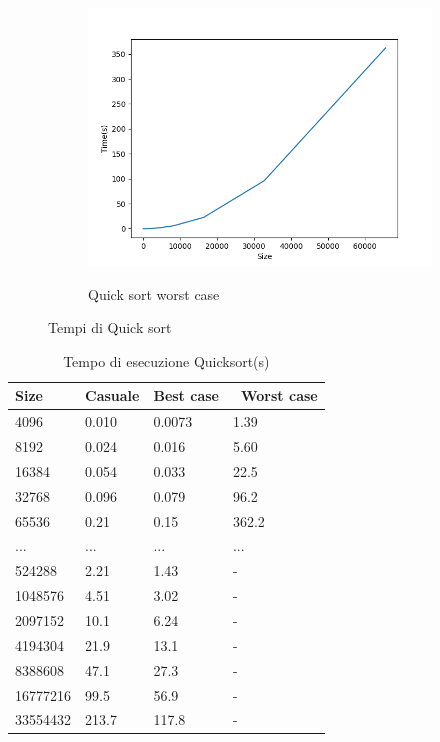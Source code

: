 \documentclass[]{article}
\begin{document}
\begin{figure}[H]
\begin{subfigure}[b]{0.4\linewidth}
        \label{fig:quick_best}
    \end{subfigure}
    \newpage
    \begin{subfigure}[b]{0.4\linewidth}
        \centering
        \caption{Quick sort worst case}
        \includegraphics[width=\textwidth]{QuickSortWorstCase}
        \label{fig:quick_worst}
    \end{subfigure}
    \caption{Tempi di Quick sort}    
    \label{fig:quick}
\end{figure}

\begin{table}[H]
\centering
\caption{Tempo di esecuzione Quicksort(s)}
\label{tab:quick}
\begin{tabular}{|l|l|l|l|} 
\hline
Size     & Casuale & Best case & ~Worst case  \\ 
\hline
4096     & 0.010   & 0.0073    & 1.39         \\
8192     & 0.024   & 0.016     & 5.60         \\
16384    & 0.054   & 0.033     & 22.5         \\
32768    & 0.096   & 0.079     & 96.2         \\
65536    & 0.21    & 0.15      & 362.2        \\
...      & ...     & ...       & ...          \\
524288   & 2.21    & 1.43      & -            \\
1048576  & 4.51    & 3.02      & -            \\
2097152  & 10.1    & 6.24      & -            \\
4194304  & 21.9    & 13.1      & -            \\
8388608  & 47.1    & 27.3      & -            \\
16777216 & 99.5    & 56.9      & -            \\
33554432 & 213.7   & 117.8     & -            \\
\hline
\end{tabular}
\end{table}
\end{document}

